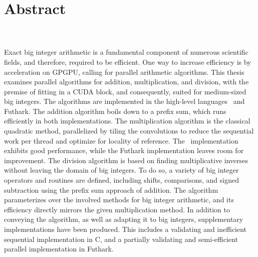 \thispagestyle{empty}
{\centering
  \section*{Abstract}
}
\label{sec:abstract}
\hfill\\\\

Exact big integer arithmetic is a fundamental component of numerous scientific
fields, and therefore, required to be efficient. One way to increase efficiency
is by acceleration on GPGPU, calling for parallel arithmetic algorithms. This
thesis examines parallel algorithms for addition, multiplication, and division,
with the premise of fitting in a CUDA block, and consequently, suited for
medium-sized big integers. The algorithms are implemented in the high-level
languages \cpp\ and Futhark. The addition algorithm boils down to a prefix sum,
which runs efficiently in both implementations. The multiplication algorithm is
the classical quadratic method, parallelized by tiling the convolutions to
reduce the sequential work per thread and optimize for locality of
reference. The \cpp\ implementation exhibits good performance, while the Futhark
implementation leaves room for improvement. The division algorithm is based on
finding multiplicative inverses without leaving the domain of big integers. To
do so, a variety of big integer operators and routines are defined, including
shifts, comparisons, and signed subtraction using the prefix sum approach of
addition. The algorithm parameterizes over the involved methods for big integer
arithmetic, and its efficiency directly mirrors the given multiplication
method. In addition to conveying the algorithm, as well as adapting it to big
integers, supplementary implementations have been produced. This includes a
validating and inefficient sequential implementation in C, and a partially
validating and semi-efficient parallel implementation in Futhark.

\restoregeometry

